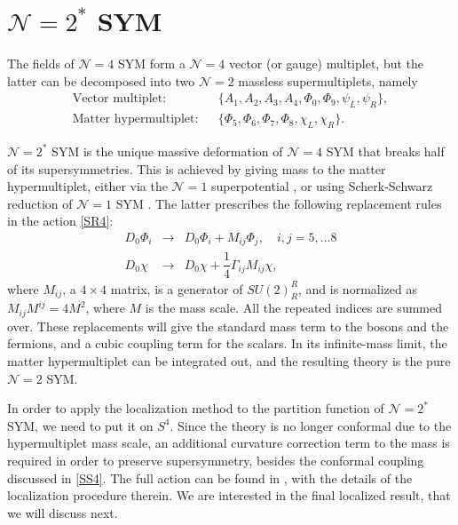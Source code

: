 \chapter{$\mathcal{N} = 2^*$ SYM}

The fields of $\mathcal{N}=4$ SYM form a $\mathcal{N}=4$ vector (or gauge) multiplet, 
but the latter can be decomposed into two $\mathcal{N}=2$ massless supermultiplets, namely
\begin{eqnarray}
 \text{Vector multiplet:} & & \{A_1, A_2, A_3, A_4, \Phi_0, \Phi_9, \psi_L, \psi_R\},  \\
 \text{Matter hypermultiplet:} & &\{\Phi_5, \Phi_6, \Phi_7, \Phi_8, \chi_L, \chi_R\}.
\end{eqnarray}	

$\mathcal{N}=2^*$ SYM is the unique massive deformation of $\mathcal{N}=4$ SYM that breaks half of its supersymmetries.
This is achieved by giving mass to the matter hypermultiplet, 
either via the $\mathcal{N}=1$ superpotential \cite{Buchel:2000cn, Bobev:2013cja}, 
or using Scherk-Schwarz reduction of $\mathcal{N}=1$ SYM \cite{Pestun:2007rz, Scherk:1979zr}.
The latter prescribes the following replacement rules in the action \eqref{SR4}:
\begin{eqnarray}
D_0 \Phi_i &\rightarrow & D_0 \Phi_i + M_{ij} \Phi_j, \quad i,j =5,\ldots 8 \\
D_0 \chi &\rightarrow & D_0 \chi + \dfrac{1}{4}\Gamma_{ij} M_{ij} \chi,
\end{eqnarray}
where $M_{ij}$, a $4 \times 4$ matrix, is a generator of $SU(2)^R_R$,
and is normalized as $M_{ij} M^{ij} = 4 M^2$, where $M$ is the mass scale. All the repeated indices are summed over.
These replacements will give the standard mass term to the bosons and the fermions, 
and a cubic coupling term for the scalars. 
In its infinite-mass limit, the matter hypermultiplet can be integrated out, 
and the resulting theory is the pure $\mathcal{N}=2$ SYM.


In order to apply the localization method to the partition function of $\mathcal{N}=2^*$ SYM,
we need to put it on $S^4$.
Since the theory is no longer conformal due to the hypermultiplet mass scale,
an additional curvature correction term to the mass is required in order to preserve supersymmetry, 
besides the conformal coupling discussed in \eqref{SS4}.
The full action can be found in \cite{Pestun:2007rz}, with the details of the localization procedure therein.
We are interested in the final localized result, that we will discuss next.

